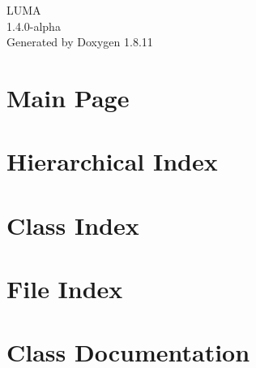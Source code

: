 \documentclass[twoside]{book}
\newcommand{\+}{\discretionary{\mbox{\scriptsize$\hookleftarrow$}}{}{}}
\newcommand{\clearemptydoublepage}{%
  \newpage{\pagestyle{empty}\cleardoublepage}%
}
\begin{document}
\hypersetup{pageanchor=false,
             bookmarksnumbered=true,
             pdfencoding=unicode
            }
\begin{titlepage}
\vspace*{7cm}
\begin{center}%
{\Large L\+U\+MA \\[1ex]\large 1.\+4.\+0-\/alpha }\\
\vspace*{1cm}
{\large Generated by Doxygen 1.8.11}\\
\end{center}
\end{titlepage}
\clearemptydoublepage
\tableofcontents
\clearemptydoublepage
{}
\hypersetup{pageanchor=true}

\chapter{Main Page}
\label{index}\hypertarget{index}{}
\chapter{Hierarchical Index}

\chapter{Class Index}

\chapter{File Index}

\chapter{Class Documentation}



















\end{document}
